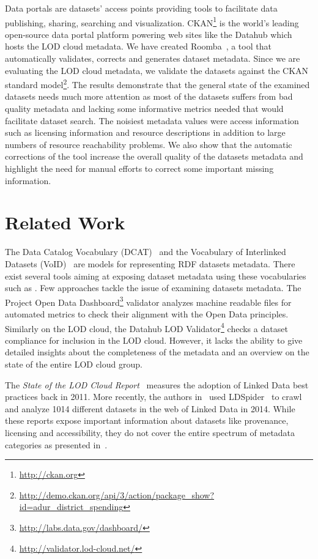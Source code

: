 \documentclass[runningheads,a4paper]{llncs}
\begin{document}
Data portals are datasets' access points providing tools to facilitate data publishing, sharing, searching and visualization. CKAN\footnote{\url{http://ckan.org}} is the world's leading open-source data portal platform powering web sites like the Datahub which hosts the LOD cloud metadata. We have created Roomba~\cite{Assaf:WWW15}, a tool that automatically validates, corrects and generates dataset metadata. Since we are evaluating the LOD cloud metadata, we validate the datasets against the CKAN standard model\footnote{\url{http://demo.ckan.org/api/3/action/package_show?id=adur_district_spending}}. The results demonstrate that the general state of the examined datasets needs much more attention as most of the datasets suffers from bad quality metadata and lacking some informative metrics needed that would facilitate dataset search. The noisiest metadata values were access information such as licensing information and resource descriptions in addition to large numbers of resource reachability problems. We also show that the automatic corrections of the tool increase the overall quality of the datasets metadata and highlight the need for manual efforts to correct some important missing information.


\section{Related Work}
\label{sec:related-work}
The Data Catalog Vocabulary (DCAT)~\cite{Erickson:14:DCV} and the Vocabulary of Interlinked Datasets (VoID)~\cite{Cyganiak:11:DLD} are models for representing RDF datasets metadata. There exist several tools aiming at exposing dataset metadata using these vocabularies such as \cite{BoHm:2011:CVD:2030805.2031001}.
Few approaches tackle the issue of examining datasets metadata. The Project Open Data Dashboard\footnote{\url{http://labs.data.gov/dashboard/}} validator analyzes machine readable files for automated metrics to check their alignment with the Open Data principles. Similarly on the LOD cloud, the Datahub LOD Validator\footnote{\url{http://validator.lod-cloud.net/}} checks a dataset compliance for inclusion in the LOD cloud. However, it lacks the ability to give detailed insights about the completeness of the metadata and an overview on the state of the entire LOD cloud group.

The \textit{State of the LOD Cloud Report}~\cite{SOLOD} measures the adoption of Linked Data best practices back in 2011. More recently, the authors in~\cite{DBLP:conf/semweb/SchmachtenbergBP14} used LDSpider~\cite{conf/semweb/IseleUBH10} to crawl and analyze 1014 different datasets in the web of Linked Data in 2014. While these reports expose important information about datasets like provenance, licensing and accessibility, they do not cover the entire spectrum of metadata categories as presented in~\cite{Framework2012}.
\end{document}
